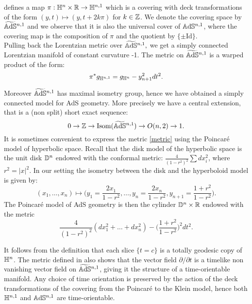 defines a map $\pi:\mathbb{H}^n\times \mathbb{R}\to \mathbb{H}^{n,1}$ which is a covering with deck transformations of the form $(y,t)\mapsto (y,t+2k\pi)$ for $k\in \mathbb{Z}$. We denote the covering space by $\widetilde{\mathbb{A}\mathrm{d}\mathbb{S}}{}^{n,1}$ and we observe that it is also the universal cover of $\mathbb{A}\mathrm{d}\mathbb{S}^{n,1}$, where the covering map is the composition of $\pi$ and the quotient by $\{\pm\text{Id}\}.$\\
Pulling back the Lorentzian metric over $\widetilde{\mathbb{A}\mathrm{d}\mathbb{S}}{}^{n,1},$ we get a simply connected Lorentzian manifold of constant curvature -1. The metric on $\widetilde{\mathbb{A}\mathrm{d}\mathbb{S}}{}^{n,1}$ is a warped product of the form: 
\begin{equation}\label{metric}
     \pi^*g_{\mathbb{H}^{n,1}}=g_{\mathbb{H}^n}-y_{n+1}^{2}dt^2.
\end{equation}
   

Moreover $\widetilde{\mathbb{A}\mathrm{d}\mathbb{S}}{}^{n,1}$ has maximal isometry group, hence we have obtained a simply connected model for AdS geometry. More precisely we have a central extension, that is a (non split) short exact sequence:
\[
    0\to \mathbb{Z}\to \textnormal{Isom}(\widetilde{\mathbb{A}\mathrm{d}\mathbb{S}}{}^{n,1})\to O(n,2)\to 1.
\]
It is sometimes convenient to express the metric \ref{metric} using the Poincaré model of hyperbolic space. Recall that the disk model of the hyperbolic space is the unit disk $\mathbb{D}^n$ endowed with the conformal metric: $\frac{4}{(1-r^2)^2}\sum dx_i^2$, where $r^2=\vert x\vert^2$. In our setting the isometry between the disk and the hyperboloid model is given by: 
\begin{equation}
    (x_1,\dots, x_n)\mapsto \Big(y_1=\frac{2x_1}{1-r^2},\dots, y_n=\frac{2x_n}{1-r^2},y_{n+1}=\frac{1+r^2}{1-r^2}\Big). 
\end{equation}
The Poincaré model of AdS geometry is then the cylinder $\mathbb{D}^n\times \mathbb{R}$ endowed with the metric 
\begin{equation}\label{metricdisk}
    \frac{4}{(1-r^2)^2}(dx_1^2+\dots+dx_n^2)-\Big(\frac{1+r^2}{1-r^2}\Big)^{2}dt^2. 
\end{equation}

It follows from the definition that each slice $\{t=c\}$ is a totally geodesic copy of $\mathbb{H}^n$. The metric defined in  also shows that the vector field $\partial/\partial t$ is a timelike non vanishing vector field on $\widetilde{\mathbb{A}\mathrm{d}\mathbb{S}}{}^{n,1}$, giving it the structure of a time-orientable manifold. Any choice of time orientation is preserved by the action of the deck transformations of the covering from the Poincaré to the Klein model, hence both $\mathbb{H}^{n,1}$ and $\mathbb{A}\mathrm{d}\mathbb{S}^{n,1}$ are time-orientable. \\

